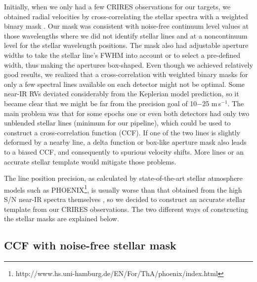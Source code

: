 \documentclass{aa}
\begin{document}
Initially, when we only had a few CRIRES observations for our targets, 
we obtained radial velocities by cross-correlating the stellar spectra with
a weighted binary mask \citep{Pepe}. Our mask was consistent with noise-free continuum level values
at those wavelengths where we did not identify stellar lines and at a noncontinuum
level for the stellar wavelength positions.
The mask also had adjustable aperture widths to take  the stellar line's FWHM  
into account or to select a pre-defined width, thus making the apertures box-shaped.
Even though we achieved relatively good results, we realized that a cross-correlation with weighted 
binary masks for only a few spectral lines available on each detector might not be optimal. 
Some near-IR RVs deviated considerably from the Keplerian model prediction, 
so it became clear that we might be far from the precision goal of 10$-$25 m\,s$^{-1}$.
The main problem was that for some epochs one or even both detectors had only two unblended 
stellar lines (minimum for our pipeline), which could be used to construct a cross-correlation function (CCF). 
If one of the two lines is slightly deformed by a nearby line, a delta function 
or box-like aperture mask  also leads to a biased CCF, and consequently 
to spurious velocity shifts. More lines or an accurate stellar template would mitigate
those problems. 

The line position precision, as calculated by state-of-the-art stellar atmosphere models such as 
PHOENIX\footnote{http://www.hs.uni-hamburg.de/EN/For/ThA/phoenix/index.html},
is usually worse than that obtained from the high S/N near-IR spectra themselves \citep{Figueira}, so
we decided to construct an accurate stellar template from our CRIRES observations.
The two different ways of constructing the stellar masks are explained below. 

 
\subsection{CCF with noise-free stellar mask}
\label{CCF with noise-free stellar mask}
\end{document}
